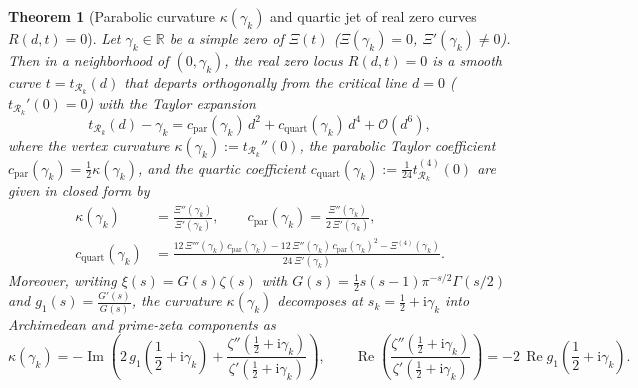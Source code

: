\documentclass[11pt,a4paper,reqno]{amsart}
\newtheorem{theorem}{Theorem}[section]
\theoremstyle{definition}
\theoremstyle{remark}
\numberwithin{equation}{section}
\newcommand{\ii}{\mathrm{i}}
\newcommand{\Rea}{\operatorname{Re}}
\newcommand{\Ima}{\operatorname{Im}}
\begin{document}
\begin{theorem}[Parabolic curvature $\kappa(\gamma_k)$ and quartic jet of real zero curves $R(d,t) = 0$]\label{thm:parabolic_curvature}
Let $\gamma_k \in \mathbb{R}$ be a simple zero of $\Xi(t)$ ($\Xi(\gamma_k) = 0$, $\Xi'(\gamma_k) \neq 0$). Then in a neighborhood of $(0, \gamma_k)$, the real zero locus $R(d,t) = 0$ is a smooth curve $t = t_{\mathcal{R}_k}(d)$ that departs orthogonally from the critical line $d = 0$ ($t_{\mathcal{R}_k}'(0) = 0$) with the Taylor expansion
\begin{equation}\label{eq:t_Rk_expansion}
t_{\mathcal{R}_k}(d) - \gamma_k = c_{\mathrm{par}}(\gamma_k)\,d^2 + c_{\mathrm{quart}}(\gamma_k)\,d^4 + \mathcal{O}(d^6),
\end{equation}
where the vertex curvature $\kappa(\gamma_k) := t_{\mathcal{R}_k}''(0)$, the parabolic Taylor coefficient $c_{\mathrm{par}}(\gamma_k) = \frac{1}{2}\kappa(\gamma_k)$, and the quartic coefficient $c_{\mathrm{quart}}(\gamma_k) := \frac{1}{24}t_{\mathcal{R}_k}^{(4)}(0)$ are given in closed form by
\begin{equation}\label{eq:kappa_and_cquart}
\begin{aligned}
\kappa(\gamma_k) &= \frac{\Xi''(\gamma_k)}{\Xi'(\gamma_k)}, \qquad c_{\mathrm{par}}(\gamma_k) = \frac{\Xi''(\gamma_k)}{2\,\Xi'(\gamma_k)}, \\
c_{\mathrm{quart}}(\gamma_k) &= \frac{12\,\Xi'''(\gamma_k)\,c_{\mathrm{par}}(\gamma_k) - 12\,\Xi''(\gamma_k)\,c_{\mathrm{par}}(\gamma_k)^2 - \Xi^{(4)}(\gamma_k)}{24\,\Xi'(\gamma_k)}.
\end{aligned}
\end{equation}
Moreover, writing $\xi(s) = G(s)\zeta(s)$ with $G(s) = \frac{1}{2}s(s-1)\pi^{-s/2}\Gamma(s/2)$ and $g_1(s) = \frac{G'(s)}{G(s)}$, the curvature $\kappa(\gamma_k)$ decomposes at $s_k = \frac{1}{2} + \ii\gamma_k$ into Archimedean and prime-zeta components as
\begin{equation}\label{eq:kappa_arch_zeta}
\kappa(\gamma_k) = -\Ima\!\left(2\,g_1\!\left(\frac{1}{2}+\ii\gamma_k\right) + \frac{\zeta''(\frac{1}{2}+\ii\gamma_k)}{\zeta'(\frac{1}{2}+\ii\gamma_k)}\right), \qquad \Rea\!\left(\frac{\zeta''(\frac{1}{2}+\ii\gamma_k)}{\zeta'(\frac{1}{2}+\ii\gamma_k)}\right) = -2\,\Rea g_1\!\left(\frac{1}{2}+\ii\gamma_k\right).
\end{equation}
\end{theorem}
\end{document}
